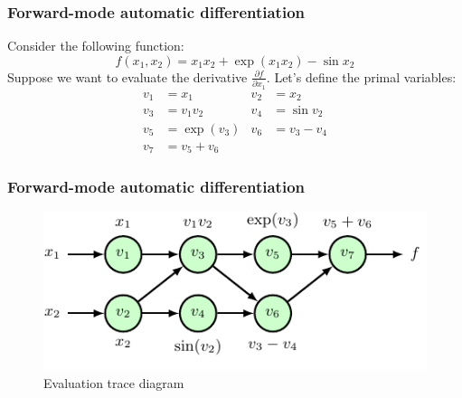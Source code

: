 \documentclass{beamer}
\begin{document}
\begin{frame}
    \frametitle{Forward-mode automatic differentiation}
    Consider the following function:
    \begin{equation*}
        f(x_{1},x_{2})=x_{1}x_{2}+\exp(x_{1}x_{2})-\sin{}x_{2}
    \end{equation*}
    Suppose we want to evaluate the derivative $\frac{\partial{}f}{\partial{}x_{1}}$. Let's define the primal variables:
    \begin{align*}
        v_{1}&=x_{1}&v_{2}&=x_{2} \\
        v_{3}&=v_{1}v_{2}&v_{4}&=\sin{}v_{2} \\
        v_{5}&=\exp(v_{3})&v_{6}&=v_{3}-v_{4} \\
        v_{7}&=v_{5}+v_{6}
    \end{align*}
\end{frame}

\begin{frame}
    \frametitle{Forward-mode automatic differentiation}
    \begin{figure}
        \caption{Evaluation trace diagram}
        \includegraphics{Figure_4.pdf}
    \end{figure}
\end{frame}
\end{document}
